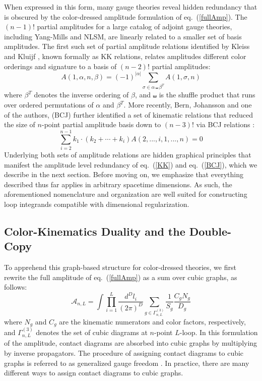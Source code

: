 \documentclass[11pt,letter]{article}
\def\eqn#1{eq.~(\ref{#1})}
\begin{document}
When expressed in this form, many gauge theories reveal hidden redundancy that is obscured by the color-dressed amplitude formulation of \eqn{fullAmp}. The $(n-1)!$ partial amplitudes for a large catalog \cite{BCJreview} of adjoint gauge theories, including Yang-Mills and NLSM, are linearly related to a smaller set of basis amplitudes. The first such set of partial amplitude relations identified by Kleiss and Kluijf \cite{Kleiss:1988ne}, known formally as KK relations, relates amplitudes different color orderings and signature to a basis of $(n-2)!$ partial amplitudes:
\begin{equation}
\label{KK}
A(1,\alpha,n,\beta)=(-1)^{|\alpha|}\sum_{\sigma\in \alpha \shuffle \beta^T} A(1,\sigma,n)
\end{equation}
where $\beta^T$ denotes the inverse ordering of $\beta$, and $\shuffle$ is the shuffle product that runs over ordered permutations of $\alpha$ and $\beta^T$. More recently, Bern, Johansson and one of the authors, (BCJ) further identified a set of kinematic relations that reduced the size of $n$-point partial amplitude basis down to $(n-3)!$ via BCJ relations \cite{BCJ}:
\begin{equation}\label{BCJ}
\sum_{i=2}^{n-1}k_1\cdot(k_2+\cdots +k_i) A(2,...,i,1,...,n)=0
\end{equation}
Underlying both sets of amplitude relations are hidden graphical  principles that manifest the amplitude level redundancy of \eqn{KK} and \eqn{BCJ}, which we  describe in the next section. Before moving on, we emphasize that everything described thus far applies in arbitrary spacetime dimensions. As such, the aforementioned nomenclature and organization are well suited for constructing loop integrands compatible with  dimensional regularization.
\label{subsec:AmpReview}

\subsection{Color-Kinematics Duality and the Double-Copy}
\label{subsec:DCReview}
To apprehend this graph-based structure for color-dressed theories, we first rewrite the full amplitude of \eqn{fullAmp} as a sum over {cubic graphs}, as follows:
\begin{equation}\label{fullAmpCubic}
\mathcal{A}_{n,L} = \int \prod_{i=1}^L\frac{d^D l_i}{(2\pi)^D} \sum_{g\in \Gamma^{(3)}_{n,L}} \frac{1}{S_g}\frac{C_gN_g}{D_g}
\end{equation}
where $N_g$ and $C_g$ are the kinematic numerators and color factors, respectively, and $ \Gamma^{(3)}_{n,L}$ denotes the set of cubic diagrams at $n$-point $L$-loop. In this formulation of the amplitude, contact diagrams are absorbed into cubic graphs by multiplying by inverse propagators. The procedure of assigning contact diagrams to cubic graphs is referred to as {generalized gauge freedom} \cite{BCJ}. In practice, there are many different ways to assign contact diagrams to cubic graphs. 
\end{document}
